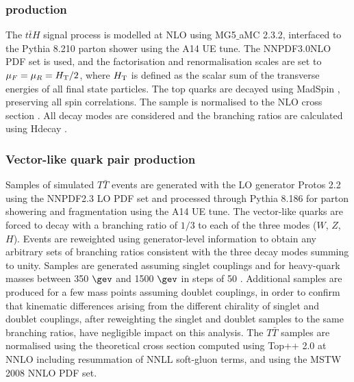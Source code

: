 \subsubsection[$t\bar{t}H$ production]{ production}
The $t\bar{t}H$ signal process is modelled at NLO using {\sc MG5$\_$aMC} 2.3.2, interfaced to the {\sc Pythia} 8.210 parton shower using the A14 UE tune. The NNPDF3.0NLO PDF set is used, and the factorisation and renormalisation scales are set to $\mu_{F} = \mu_{R} = H_{\rm T}/2$, where $H_{\rm T}$ is defined as the scalar sum of the transverse energies of all final state particles. The top quarks are decayed using {\sc MadSpin} \cite{madspin}, preserving all spin correlations. The sample is normalised to the NLO cross section \cite{ttH1,ttH2,ttH3,Yu:2014cka,Frixione:2015zaa}. All decay modes are considered and the branching ratios are calculated using {\sc Hdecay} \cite{hdecay}.

\subsubsection{Vector-like quark pair production }
Samples of simulated $T\bar{T}$ events are generated with the LO generator {\sc Protos} 2.2 using the NNPDF2.3 LO PDF set and processed through {\sc Pythia} 8.186 for parton showering and fragmentation using the A14 UE tune. The vector-like quarks are forced to decay with a branching ratio of $1/3$ to each of the three modes ($W$, $Z$, $H$). Events are reweighted using generator-level information to obtain any arbitrary sets of branching ratios consistent with the three decay modes summing to unity. Samples are generated assuming singlet couplings and for heavy-quark masses between 350 $\gev$ and 1500 $\gev$ in steps of 50 \gev. Additional samples are produced for a few mass points assuming doublet couplings, in order to confirm that kinematic differences arising from the different chirality of singlet and doublet couplings, after reweighting the singlet and doublet samples to the same branching ratios, have negligible impact on this analysis. The  $T\bar{T}$ samples are normalised using the theoretical cross section computed using {\sc Top++} 2.0 at NNLO including resummation of NNLL soft-gluon terms, and using the MSTW 2008 NNLO PDF set.
